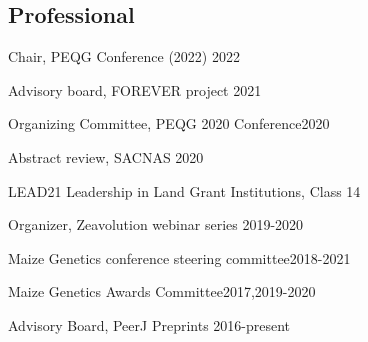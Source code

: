 \documentclass[letterpaper,10pt]{article}
\renewenvironment{itemize}{
  \begin{list}{}{
    \setlength{\leftmargin}{1.5em}
  }
}{
  \end{list}
}
\begin{document}
\begin{itemize}
\subsection*{Professional}
\item Chair, PEQG Conference (2022) \hfill2022
\item Advisory board, FOREVER project \hfill2021 %
\item Organizing Committee, PEQG 2020 Conference\hfill2020
\item Abstract review, SACNAS \hfill 2020
\item LEAD21 Leadership in Land Grant Institutions, Class 14%
\item Organizer, Zeavolution webinar series \hfill2019-2020
\item Maize Genetics conference steering committee\hfill2018-2021
\item Maize Genetics Awards Committee\hfill2017,2019-2020
\item Advisory Board, PeerJ Preprints \hfill 2016-present

\end{itemize}
\end{document}
